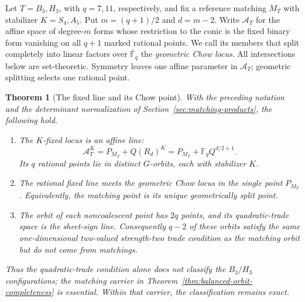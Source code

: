 \documentclass[11pt]{article}
\newtheorem{theorem}{Theorem}[section]
\theoremstyle{definition}
\theoremstyle{remark}
\newcommand{\F}{\mathbb{F}}
\begin{document}
Let \(T=B_3,H_3\), with \(q=7,11\), respectively, and fix a reference
matching \(M_T\) with stabilizer \(K=S_4,A_5\).  Put
\(m=(q+1)/2\) and \(d=m-2\).  Write \(\mathcal A_T\) for the affine space
of degree-\(m\) forms whose restriction to the conic is the fixed binary form
vanishing on all \(q+1\) marked rational points.  We call its members that
split completely into linear factors over \(\overline{\F}_q\) the
\emph{geometric Chow locus}.  All intersections below are set-theoretic.
Symmetry leaves one affine parameter in \(\mathcal A_T\); geometric
splitting selects one rational point.

\begin{theorem}[The fixed line and its Chow point]
\label{thm:fixed-line-chow-rigidity}
With the preceding notation and the determinant normalization of
Section~\ref{sec:matching-products}, the following hold.

\begin{enumerate}[label=\textup{(\roman*)},leftmargin=*]
\item The \(K\)-fixed locus is an affine line:
\[
 \mathcal A_T^K
   =P_{M_T}+Q(R_d)^K
   =P_{M_T}+\F_q Q^{d/2+1}.                         \tag{4.4a}
\]
Its \(q\) rational points lie in distinct \(G\)-orbits, each with
stabilizer \(K\).

\item The rational fixed line meets the geometric Chow locus in the single
point \(P_{M_T}\).  Equivalently, the matching point is its unique
geometrically split point.

\item The orbit of each noncoalescent point has \(2q\) points, and its
quadratic-trade space is the sheet-sign line.  Consequently \(q-2\) of
these orbits satisfy the same one-dimensional two-valued strength-two trade
condition as the matching orbit but do not come from matchings.
\end{enumerate}
Thus the quadratic-trade condition alone does not classify the
\(B_3/H_3\) configurations; the matching carrier in
Theorem~\ref{thm:balanced-orbit-completeness} is essential.  Within that
carrier, the classification remains exact.
\end{theorem}
\end{document}
